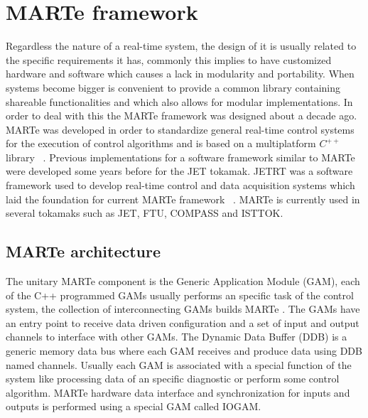 \section{MARTe framework}
Regardless the nature of a real-time system, the design of it is usually related to the specific requirements it has, commonly this implies to have customized hardware and software which causes a lack in modularity and portability. When systems become bigger is convenient to provide a common library containing shareable functionalities and which also allows for modular implementations. In order to deal with this the MARTe framework was designed about a decade ago. MARTe was developed in order to standardize general real-time control systems for the execution of control algorithms and is based on a multiplatform $C^{++}$ library ~\cite{Neto2010}.  Previous implementations for a  software framework similar to MARTe were developed some years before for the JET tokamak. JETRT was a software framework used to develop real-time control and data acquisition systems which laid the foundation for current MARTe framework ~\cite{JETRT}. MARTe is currently used in several tokamaks such as JET, FTU, COMPASS and ISTTOK. 

\subsection{MARTe architecture }
The unitary MARTe component is the Generic Application Module (GAM), each of the C++ programmed GAMs usually performs an specific task of the control system, the collection of interconnecting GAMs builds MARTe  \cite{Neto2011}. The GAMs  have an entry point to receive data driven configuration and a set of input and output channels to interface with other GAMs. The Dynamic Data Buffer (DDB) is a generic memory data bus where each GAM receives and produce data using DDB named channels. Usually each GAM is associated with a special function of the system like processing data of an specific diagnostic or perform some  control algorithm. MARTe hardware data interface and synchronization for inputs and outputs is performed using a special GAM called IOGAM.


